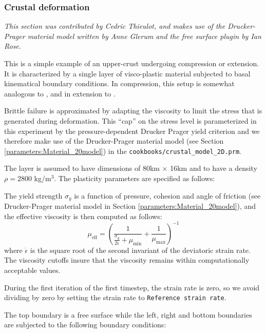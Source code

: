 \documentclass{article}
\begin{document}
\subsubsection{Crustal deformation}
\label{sec:cookbooks-crustal-deformation}

\textit{This section was contributed by Cedric Thieulot, and makes use of the Drucker-Prager 
material model written by Anne Glerum and the free surface plugin by Ian Rose.}

This is a simple example of an upper-crust undergoing compression or extension.
It is characterized by a single layer of visco-plastic material subjected to basal 
kinematical boundary conditions. In compression, this setup is somewhat analogous 
to \cite{will99}, and in extension to \cite{alht11}.

Brittle failure is approximated by adapting the viscosity to limit the stress 
that is generated during deformation. 
This ``cap'' on the stress level is parameterized in this experiment by the pressure-dependent 
Drucker Prager yield criterion  and we therefore make use of the Drucker-Prager 
material model (see Section \ref{parameters:Material_20model}) in the 
{\tt cookbooks/crustal\_model\_2D.prm}.

The layer is assumed to have dimensions of 80km $\times$ 16km and to have a density  $\rho=2800$ kg/m$^3$. 
The plasticity parameters are specified as follows:



The yield strength $\sigma_y$ is a function of pressure, cohesion and angle of friction 
(see Drucker-Prager material model in Section \ref{parameters:Material_20model}),
and the effective viscosity is then computed as follows:
\[
\mu_{\text{eff}} = \left( \frac{1}{ \frac{\sigma_y}{2 \dot{\epsilon}}+
\mu_{\text{min}}} + \frac{1}{\mu_{\text{max}}}  \right)^{-1}
\]
where $\dot{\epsilon}$ is the square root of the second invariant of the deviatoric strain rate.
The viscosity cutoffs insure that the viscosity remains within computationally acceptable values.

During the first iteration of the first timestep, the strain rate is zero, so
we avoid dividing by zero by setting the strain rate to {\tt Reference strain rate}.


The top boundary is a free surface while the left, right and bottom boundaries are subjected 
to the following boundary conditions:


\end{document}

